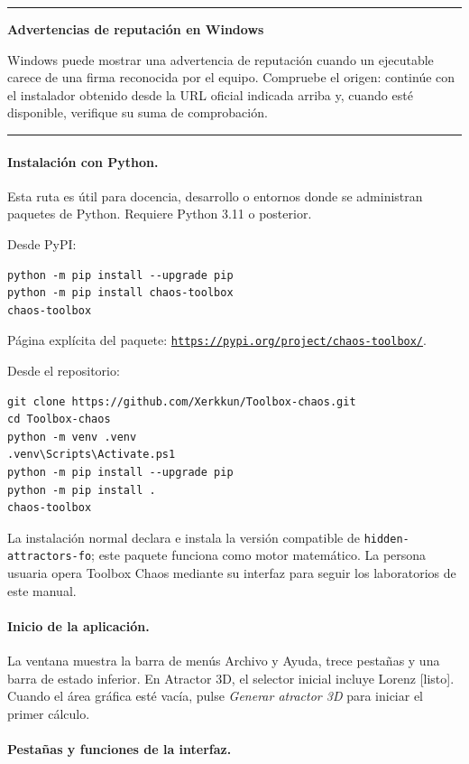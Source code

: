 \documentclass[11pt]{article}
\newcommand{\boton}[1]{\textsf{\itshape #1}}
\newcommand{\campo}[1]{\textsf{#1}}
\newcommand{\archivo}[1]{\nolinkurl{#1}}
\newcommand{\urlimpresa}[1]{\href{#1}{\nolinkurl{#1}}}
\newenvironment{cajaalerta}[1]
{\begin{center}\begin{minipage}{0.93\linewidth}\color{GrisTexto}
\textcolor{Naranja}{\rule{\linewidth}{0.8pt}}\par\smallskip
\textcolor{Naranja}{\bfseries #1}\par\smallskip}
{\par\smallskip\textcolor{Naranja}{\rule{\linewidth}{0.8pt}}\end{minipage}\end{center}}
\begin{document}
\begin{cajaalerta}{Advertencias de reputación en Windows}
Windows puede mostrar una advertencia de reputación cuando un ejecutable carece de una firma reconocida por el equipo. Compruebe el origen: continúe con el instalador obtenido desde la URL oficial indicada arriba y, cuando esté disponible, verifique su suma de comprobación.
\end{cajaalerta}

\paragraph{Instalación con Python.}

Esta ruta es útil para docencia, desarrollo o entornos donde se administran paquetes de Python. Requiere Python 3.11 o posterior.

Desde PyPI:
\begin{verbatim}
python -m pip install --upgrade pip
python -m pip install chaos-toolbox
chaos-toolbox
\end{verbatim}

Página explícita del paquete: \urlimpresa{https://pypi.org/project/chaos-toolbox/}.

Desde el repositorio:
\begin{verbatim}
git clone https://github.com/Xerkkun/Toolbox-chaos.git
cd Toolbox-chaos
python -m venv .venv
.venv\Scripts\Activate.ps1
python -m pip install --upgrade pip
python -m pip install .
chaos-toolbox
\end{verbatim}

La instalación normal declara e instala la versión compatible de \archivo{hidden-attractors-fo}; este paquete funciona como motor matemático. La persona usuaria opera Toolbox Chaos mediante su interfaz para seguir los laboratorios de este manual.

\paragraph{Inicio de la aplicación.}

La ventana muestra la barra de menús \campo{Archivo} y \campo{Ayuda}, trece pestañas y una barra de estado inferior. En \campo{Atractor 3D}, el selector inicial incluye \campo{Lorenz [listo]}. Cuando el área gráfica esté vacía, pulse \boton{Generar atractor 3D} para iniciar el primer cálculo.

\paragraph{Pestañas y funciones de la interfaz.}
\end{document}
